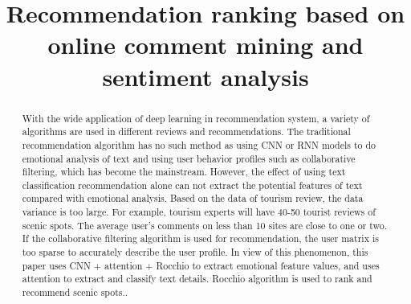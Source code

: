 \documentclass[conference]{IEEEtran}
\begin{document}
\title{Recommendation ranking based on online comment mining and sentiment analysis
}
\author{
    \and
    \and
    \and

}

\maketitle

\begin{abstract}
    With the wide application of deep learning in recommendation system, a variety of algorithms are used in different reviews and recommendations. The traditional recommendation algorithm has no such method as using CNN or RNN models to do emotional analysis of text and using user behavior profiles such as collaborative filtering, which has become the mainstream. However, the effect of using text classification recommendation alone can not extract the potential features of text compared with emotional analysis. Based on the data of tourism review, the data variance is too large. For example, tourism experts will have 40-50 tourist reviews of scenic spots. The average user's comments on less than 10 sites are close to one or two. If the collaborative filtering algorithm is used for recommendation, the user matrix is too sparse to accurately describe the user profile. In view of this phenomenon, this paper uses CNN + attention + Rocchio to extract emotional feature values, and uses attention to extract and classify text details. Rocchio algorithm is used to rank and recommend scenic spots..
\end{abstract}
\end{document}
